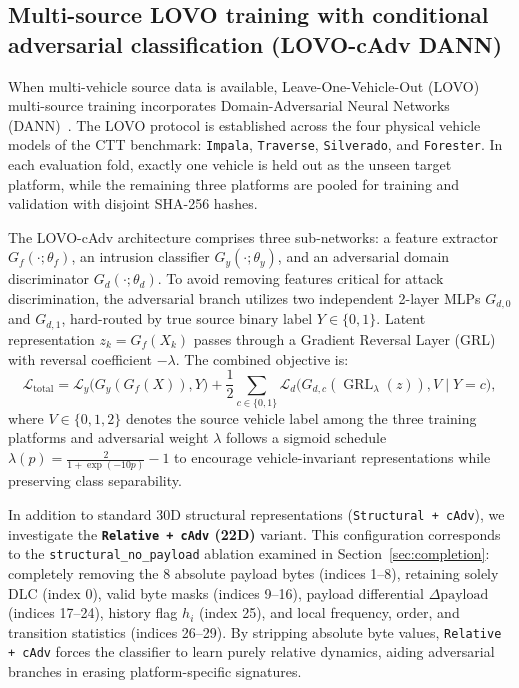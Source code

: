 \documentclass[12pt, a4paper, reqno, oneside]{book}
\DeclareRobustCommand{\code}[1]{\nolinkurl{#1}}
\begin{document}
\subsection{Multi-source LOVO training with conditional adversarial classification (LOVO-cAdv DANN)}\label{subsec:method-lovo}
When multi-vehicle source data is available, Leave-One-Vehicle-Out (LOVO) multi-source training incorporates Domain-Adversarial Neural Networks (DANN)~\cite{ganin2016dann}. The LOVO protocol is established across the four physical vehicle models of the CTT benchmark: \code{Impala}, \code{Traverse}, \code{Silverado}, and \code{Forester}. In each evaluation fold, exactly one vehicle is held out as the unseen target platform, while the remaining three platforms are pooled for training and validation with disjoint SHA-256 hashes.

The LOVO-cAdv architecture comprises three sub-networks: a feature extractor $G_f(\cdot; \theta_f)$, an intrusion classifier $G_y(\cdot; \theta_y)$, and an adversarial domain discriminator $G_d(\cdot; \theta_d)$. To avoid removing features critical for attack discrimination, the adversarial branch utilizes two independent 2-layer MLPs $G_{d,0}$ and $G_{d,1}$, hard-routed by true source binary label $Y \in \{0, 1\}$. Latent representation $z_k = G_f(X_k)$ passes through a Gradient Reversal Layer (GRL) with reversal coefficient $-\lambda$. The combined objective is:
\begin{equation}
\mathcal{L}_{\text{total}} = \mathcal{L}_y\big(G_y(G_f(X)), Y\big) + \frac{1}{2}\sum_{c\in\{0,1\}} \mathcal{L}_d\big(G_{d,c}(\operatorname{GRL}_{\lambda}(z)), V \mid Y=c\big),
\end{equation}
where $V \in \{0, 1, 2\}$ denotes the source vehicle label among the three training platforms and adversarial weight $\lambda$ follows a sigmoid schedule $\lambda(p) = \frac{2}{1 + \exp(-10p)} - 1$ to encourage vehicle-invariant representations while preserving class separability.

In addition to standard 30D structural representations (\code{Structural + cAdv}), we investigate the \textbf{\code{Relative + cAdv} (22D)} variant. This configuration corresponds to the \code{structural_no_payload} ablation examined in Section~\ref{sec:completion}: completely removing the 8 absolute payload bytes (indices 1--8), retaining solely DLC (index 0), valid byte masks (indices 9--16), payload differential $\Delta\text{payload}$ (indices 17--24), history flag $h_i$ (index 25), and local frequency, order, and transition statistics (indices 26--29). By stripping absolute byte values, \code{Relative + cAdv} forces the classifier to learn purely relative dynamics, aiding adversarial branches in erasing platform-specific signatures.
\end{document}
